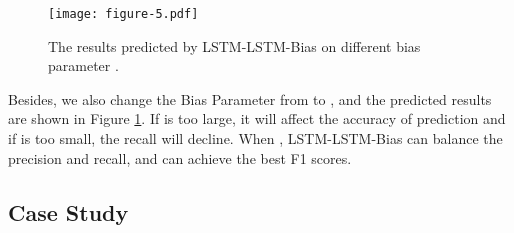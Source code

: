 \documentclass[11pt,a4paper]{article}
\begin{document}
 \begin{figure}[h]
 \begin{center}
\texttt{[image: figure-5.pdf]}
\caption{\label{loss}The results predicted by LSTM-LSTM-Bias on different bias parameter .}
 \end{center}
\end{figure}

Besides, we also change the Bias Parameter  from  to , and the predicted results are shown in Figure \ref{loss}.
 If  is too large, it will affect the accuracy of prediction and if  is too small, the recall will decline.
 When , LSTM-LSTM-Bias can balance the precision and recall, and can achieve the best F1 scores.
\subsection{Case Study}
\end{document}
